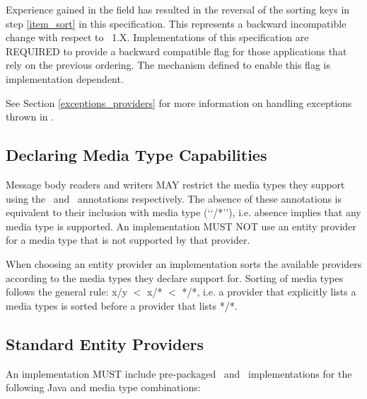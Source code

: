 Experience gained in the field has resulted in the reversal of the sorting keys in step
\ref{item_sort} in this specification. This represents a backward incompatible change
with respect to \jaxrs\ 1.X. Implementations of this specification are REQUIRED to
provide a backward compatible flag for those applications that rely on the previous
ordering. The mechanism defined to enable this flag is implementation dependent.

See Section \ref{exceptions_providers} for more information on handling exceptions thrown in \MsgWrite{}.

\subsection{Declaring Media Type Capabilities}
\label{declaring_provider_capabilities}

Message body readers and writers MAY restrict the media types they support using the \Consumes\ and \Produces\ annotations respectively. The absence of these annotations is equivalent to their inclusion with media type (\lq\lq*/*\rq\rq), i.e. absence implies that any media type is supported. An implementation MUST NOT use an entity provider for a media type that is not supported by that provider.

When choosing an entity provider an implementation sorts the available providers according to the media types they declare support for. Sorting of media types follows the general rule: x/y $<$ x/* $<$ */*, i.e. a provider that explicitly lists a media types is sorted before a provider that lists */*.

\subsection{Standard Entity Providers}
\label{standard_entity_providers}
 
An implementation MUST include pre-packaged \MsgRead\ and \MsgWrite\ implementations for the following Java and media type combinations:

